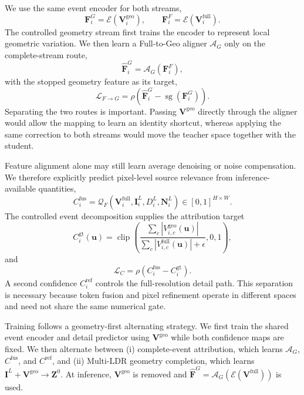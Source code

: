 We use the same event encoder for both streams,
\begin{equation}
    \bm F_i^{G}=\mathcal E(\bm V_i^{\mathrm{geo}}),
    \qquad
    \bm F_i^{F}=\mathcal E(\bm V_i^{\mathrm{full}}).
\end{equation}
The controlled geometry stream first trains the encoder to represent local
geometric variation. We then learn a Full-to-Geo aligner $\mathcal A_G$ only
on the complete-stream route,
\begin{equation}
    \widehat{\bm F}_i^{G}=\mathcal A_G(\bm F_i^{F}),
\end{equation}
with the stopped geometry feature as its target,
\begin{equation}
    \mathcal L_{F\rightarrow G}
    =\rho\!\left(\widehat{\bm F}_i^{G}
    -\operatorname{sg}(\bm F_i^{G})\right).
\end{equation}
Separating the two routes is important. Passing
$\bm V^{\mathrm{geo}}$ directly through the aligner would allow the mapping to
learn an identity shortcut, whereas applying the same correction to both
streams would move the teacher space together with the student.

Feature alignment alone may still learn average denoising or noise
compensation. We therefore explicitly predict pixel-level source relevance
from inference-available quantities,
\begin{equation}
    C_i^{\mathrm{fus}}
    =\mathcal Q_F(\bm V_i^{\mathrm{full}},\bm I_i^{L},
                  D_i^{L},\bm N_i^{L})\in[0,1]^{H\times W}.
\end{equation}
The controlled event decomposition supplies the attribution target
\begin{equation}
    C_i^{\mathrm{gt}}(\bm u)=
    \operatorname{clip}\left(
    \frac{\sum_c|V_{i,c}^{\mathrm{geo}}(\bm u)|}
         {\sum_c|V_{i,c}^{\mathrm{full}}(\bm u)|+\epsilon},0,1\right),
\end{equation}
and
\begin{equation}
    \mathcal L_C=\rho(C_i^{\mathrm{fus}}-C_i^{\mathrm{gt}}).
\end{equation}
A second confidence $C_i^{\mathrm{ref}}$ controls the full-resolution detail
path. This separation is necessary because token fusion and pixel refinement
operate in different spaces and need not share the same numerical gate.

Training follows a geometry-first alternating strategy. We first train the
shared event encoder and detail predictor using $\bm V^{\mathrm{geo}}$ while
both confidence maps are fixed. We then alternate between (i) complete-event
attribution, which learns $\mathcal A_G$, $C^{\mathrm{fus}}$, and
$C^{\mathrm{ref}}$, and (ii) Multi-LDR geometry completion, which learns
$\bm I^{L}+\bm V^{\mathrm{geo}}\rightarrow\bm Z^{0}$. At inference,
$\bm V^{\mathrm{geo}}$ is removed and
$\widehat{\bm F}^{G}=\mathcal A_G(\mathcal E(\bm V^{\mathrm{full}}))$ is used.

